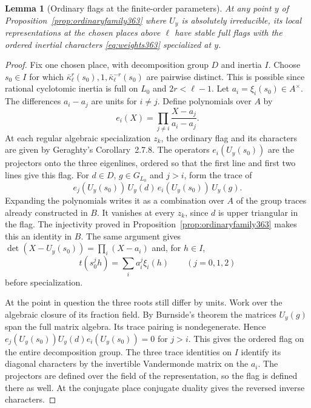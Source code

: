 \documentclass[a4paper,11pt]{article}
\newtheorem{lemma}[proposition]{Lemma}
\theoremstyle{definition}
\theoremstyle{remark}
\numberwithin{equation}{section}
\begin{document}
\begin{lemma}[Ordinary flags at the finite-order parameters]
\label{lem:ordinaryflags363}
At any point \(y\) of Proposition~\ref{prop:ordinaryfamily363}
where \(U_y\) is absolutely irreducible, its local representations
at the chosen places above \(\ell\) have stable full flags with
the ordered inertial characters \eqref{eq:weights363}
specialized at \(y\).
\end{lemma}
\begin{proof}
Fix one chosen place, with decomposition group \(D\) and inertia
\(I\). Choose \(s_0\in I\) for which
\(\bar\kappa_\ell^r(s_0),1,\bar\kappa_\ell^{-r}(s_0)\)
are pairwise distinct. This is possible since rational
cyclotomic inertia is full on \(L_0\) and \(2r<\ell-1\).
Let \(a_i=\xi_i(s_0)\in A^\times\). The differences \(a_i-a_j\)
are units for \(i\ne j\). Define polynomials over \(A\) by
\[
          e_i(X)=\prod_{j\ne i}\frac{X-a_j}{a_i-a_j}.
\]
At each regular algebraic specialization \(z_k\), the ordinary
flag and its characters are given by Geraghty's
Corollary~2.7.8. The operators \(e_i(U_y(s_0))\) are the
projectors onto the three eigenlines, ordered so that the first
line and first two lines give this flag. For \(d\in D\),
\(g\in G_{L_0}\) and \(j>i\), form the trace of
\[
       e_j(U_y(s_0))\,U_y(d)\,e_i(U_y(s_0))\,U_y(g).
\]
Expanding the polynomials writes it as a combination over \(A\)
of the group traces already constructed in \(B\). It vanishes
at every \(z_k\), since \(d\) is upper triangular in the flag.
The injectivity proved in Proposition~\ref{prop:ordinaryfamily363}
makes this an identity in \(B\). The same argument gives
\(\det(X-U_y(s_0))=\prod_i(X-a_i)\) and, for \(h\in I\),
\[
             t(s_0^j h)=\sum_i a_i^j\xi_i(h)
                          \qquad (j=0,1,2)
\]
before specialization.~\cite{VII-V-geraghty363}

At the point in question the three roots still differ by units.
Work over the algebraic closure of its fraction field. By
Burnside's theorem the matrices \(U_y(g)\) span the full matrix
algebra. Its trace pairing is nondegenerate. Hence
\(e_j(U_y(s_0))U_y(d)e_i(U_y(s_0))=0\) for \(j>i\).
This gives the ordered flag on the entire decomposition group.
The three trace identities on \(I\) identify its diagonal
characters by the invertible Vandermonde matrix on the \(a_i\).
The projectors are defined over the field of the representation,
so the flag is defined there as well. At the conjugate place
conjugate duality gives the reversed inverse characters.
\end{proof}
\end{document}
